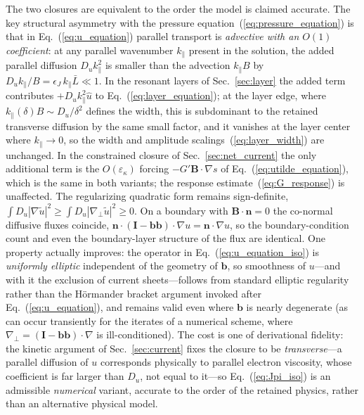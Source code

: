 \documentclass[english]{article}
\newcommand{\bB}{\mathbf{B}}
\newcommand{\bb}{\mathbf{b}}
\newcommand{\bn}{\mathbf{n}}
\newcommand{\bI}{\mathbf{I}}
\newcommand{\gradperp}{\nabla_{\!\perp}}
\begin{document}
The two closures are equivalent to the order the model is claimed accurate. The key
structural asymmetry with the pressure equation~(\ref{eq:pressure_equation}) is that in
Eq.~(\ref{eq:u_equation}) parallel transport is \emph{advective with an $O(1)$
coefficient}: at any parallel wavenumber $k_\parallel$ present in the solution, the added
parallel diffusion $D_u k_\parallel^{2}$ is smaller than the advection $k_\parallel B$ by
$D_u k_\parallel/B=\epsilon_J\,k_\parallel\bar L\ll1$. In the resonant layers of
Sec.~\ref{sec:layer} the added term contributes $+D_u k_\parallel^{2}\hat u$ to
Eq.~(\ref{eq:layer_equation}); at the layer edge, where
$k_\parallel(\delta)B\sim D_u/\delta^{2}$ defines the width, this is subdominant to the
retained transverse diffusion by the same small factor, and it vanishes at the layer
center where $k_\parallel\rightarrow0$, so the width and amplitude
scalings~(\ref{eq:layer_width}) are unchanged. In the constrained closure of
Sec.~\ref{sec:net_current} the only additional term is the $O(\varepsilon_\kappa)$ forcing
$-G'\bB\cdot\nabla s$ of Eq.~(\ref{eq:utilde_equation}), which is the same in both variants; the
response estimate~(\ref{eq:G_response}) is unaffected. The regularizing quadratic form remains
sign-definite, $\int D_u|\nabla\tilde u|^{2}\ge\int D_u|\gradperp\tilde u|^{2}\ge0$. On a boundary
with $\bB\cdot\bn=0$ the co-normal diffusive fluxes coincide,
$\bn\cdot(\bI-\bb\bb)\cdot\nabla u=\bn\cdot\nabla u$, so the boundary-condition count and
even the boundary-layer structure of the flux are identical. One property actually
improves: the operator in Eq.~(\ref{eq:u_equation_iso}) is \emph{uniformly elliptic}
independent of the geometry of $\bb$, so smoothness of $u$---and with it the exclusion of
current sheets---follows from standard elliptic regularity rather than the H\"ormander
bracket argument invoked after Eq.~(\ref{eq:u_equation}), and remains valid even where
$\bb$ is nearly degenerate (as can occur transiently for the iterates of a numerical
scheme, where $\gradperp=(\bI-\bb\bb)\cdot\nabla$ is ill-conditioned). The cost is one of
derivational fidelity: the kinetic argument of Sec.~\ref{sec:current} fixes the closure
to be \emph{transverse}---a parallel diffusion of $u$ corresponds physically to parallel
electron viscosity, whose coefficient is far larger than $D_u$, not equal to it---so
Eq.~(\ref{eq:Jpi_iso}) is an admissible \emph{numerical} variant, accurate to the order
of the retained physics, rather than an alternative physical model.
\end{document}
